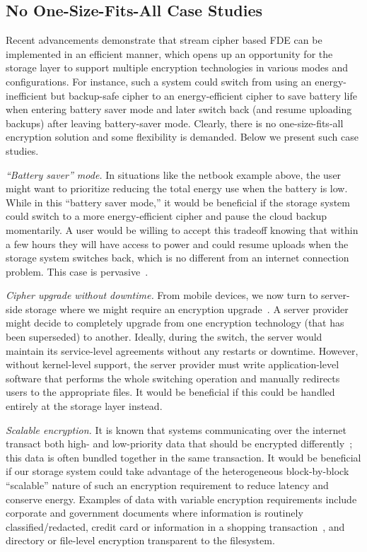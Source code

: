 \subsection{No One-Size-Fits-All Case Studies}

Recent advancements demonstrate that stream cipher based FDE can be implemented
in an efficient manner, which opens up an opportunity for the storage layer to
support multiple encryption technologies in various modes and configurations.
For instance, such a system could switch from using an energy-inefficient but
backup-safe cipher to an energy-efficient cipher to save battery life when
entering battery saver mode and later switch back (and resume uploading backups)
after leaving battery-saver mode. Clearly, there is no one-size-fits-all
encryption solution and some flexibility is demanded. Below we present \numCases
such case studies.

{\em ``Battery saver'' mode.} In situations like the netbook example above, the
user might want to prioritize reducing the total energy use when the battery is
low. While in this ``battery saver mode,'' it would be beneficial if the storage
system could switch to a more energy-efficient cipher and pause the cloud backup
momentarily. A user would be willing to accept this tradeoff knowing that within
a few hours they will have access to power and could resume uploads when the
storage system switches back, which is no different from an internet connection
problem. This case is pervasive~\cite{battery-saver1, battery-saver2,
battery-saver3, battery-saver4, battery-saver5}.

{\em Cipher upgrade without downtime.} From mobile devices, we now turn to
server-side storage where we might require an encryption
upgrade~\cite{upgrade-encryption1,upgrade-encryption2,upgrade-encryption3}. A
server provider might decide to completely upgrade from one encryption
technology (\eg that has been superseded) to another. Ideally, during the
switch, the server would maintain its service-level agreements without any
restarts or downtime. However, without kernel-level support, the server provider
must write application-level software that performs the whole switching
operation and manually redirects users to the appropriate files. It would be
beneficial if this could be handled entirely at the storage layer instead.

{\em Scalable encryption.} It is known that systems communicating over the
internet transact both high- and low-priority data that should be encrypted
differently~\cite{ScalableSecurity}; this data is often bundled together in the
same transaction. It would be beneficial if our storage system could take
advantage of the heterogeneous block-by-block ``scalable'' nature of such an
encryption requirement to reduce latency and conserve energy. Examples of data
with variable encryption requirements include corporate and government documents
where information is routinely classified/redacted, credit card or information
in a shopping transaction~\cite{ScalableSecurity}, and directory or file-level
encryption transparent to the filesystem.
